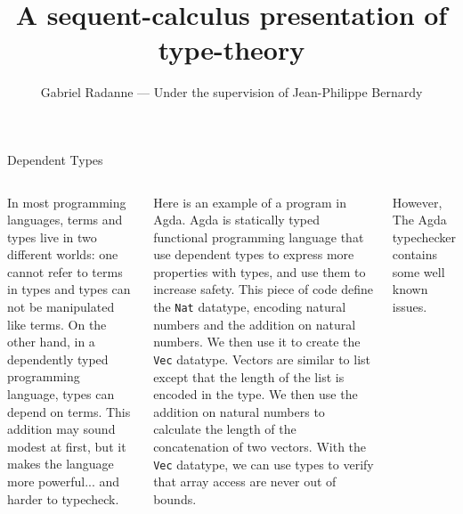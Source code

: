 \documentclass[final, xcolor=svgnames]{beamer}
\title{A sequent-calculus presentation of type-theory}
\author{Gabriel Radanne --- Under the supervision of Jean-Philippe Bernardy}
\institute{ENS Rennes --- Chalmers University of Technology}
\begin{document}
\raggedright{}
\begin{frame}[shrink]
  \begin{block}{Dependent Types}
    \begin{columns}[t]
      In most programming languages, terms and types live in two different worlds: one cannot refer to terms in types and types can not be manipulated like terms.
      On the other hand, in a dependently typed programming language, types can depend on terms.
      This addition may sound modest at first, but it makes the language more powerful... and harder to typecheck.

      Here is an example of a program in Agda. Agda is statically typed functional programming language that use dependent types to express more properties with types, and use them to increase safety.
      This piece of code define the \lstinline[language=nanoAgda]{Nat} datatype, encoding natural numbers and the addition on natural numbers.
      We then use it to create the \lstinline[language=nanoAgda]{Vec} datatype. Vectors are similar to list except that the length of the list is encoded in the type. We then use the addition on natural numbers to calculate the length of the concatenation of two vectors.
      With the \lstinline[language=nanoAgda]{Vec} datatype, we can use types to verify that array access are never out of bounds.

      However, The Agda typechecker contains some well known issues.
      
    \end{columns}
  \end{block}



\end{frame}
\end{document}
